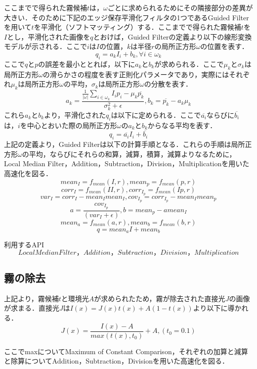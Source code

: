 \documentclass{jsarticle}
\begin{document}
ここまでで得られた霧候補$t$は，$\omega$ごとに求められるためにその隣接部分の差異が大きい．そのために下記のエッジ保存平滑化フィルタの1つであるGuided Filter\cite{2}を用いて$t$を平滑化（ソフトマッティング）する．ここまでで得られた霧候補$t$を$I$とし，平滑化された画像を$q$とおけば，Guided Filterの定義より以下の線形変換モデルが示される．ここで$i$は$I$の位置，$k$は半径$r$の局所正方形$\omega$の位置を表す．
\[
q_i = a_k I_i + b_k, \forall i \in \omega_k
\]
ここで$q$と$p$の誤差を最小ととれば，以下に$a_k$と$b_k$が求められる．ここで$\mu_k$と$\sigma_k$は局所正方形$\omega$の滑らかさの程度を表す正則化パラメータであり，実際にはそれぞれ$\mu_k$は局所正方形$\omega$の平均，$\sigma_k$は局所正方形$\omega$の分散を表す．
\[
a_k = \frac{\frac{1}{|\omega|} \sum_{i \in \omega_k} I_i p_i - \mu_k \overline{p_k}}{\sigma_k^2 + \epsilon},
b_k = \overline{p_k} - a_k \mu_k
\]
これら$a_k$と$b_k$より，平滑化された$q_i$は以下に定められる．ここで$\overline{a_i}$ならびに$\overline{b_i}$は，$i$を中心とおいた際の局所正方形$\omega$の$a_k$と$b_k$からなる平均を表す．
\[
q_i = \overline{a_i} I_i + \overline{b_i}
\]
上記の定義より，Guided Filterは以下の計算手順となる．これらの手順は局所正方形$\omega$の平均，ならびにそれらの和算，減算，積算，減算よりなるために， Local Median Filter，Addition，Subtraction，Division，Multiplicationを用いた高速化を図る．
\[
mean_I = f_{mean}(I,r), mean_p = f_{mean}(p,r)
\]
\[
corr_I = f_{mean}(II,r), corr_{I_{p}} = f_{mean}(Ip,r)
\]
\[
var_I = corr_I - mean_I  mean_I, cov_{I_{p}} = corr_{I_{p}} - mean_I mean_p
\]
\[
a = \frac{cov_{I_{p}}}{(var_I + \epsilon)}, b = mean_p - a  mean_I
\]
\[
mean_a = f_{mean}(a,r), mean_b = f_{mean}(b,r)
\]
\[
q = mean_a  I + mean_b
\]

\begin{itembox}[l]{利用するAPI}
\[
Local Median Filter，Addition，Subtraction，Division，Multiplication
\]
\end{itembox}

\subsection{霧の除去}
\label{霧の除去}

上記より，霧候補$t$と環境光$A$が求められたため，霧が除去された直接光$J$の画像が求まる．直接光$J$は$I(x)=J(x)t(x)+A(1-t(x))$より以下に導かれる．
\[
J(x)=\frac{I(x)-A}{max(t(x), t_0)} + A,(t_0=0.1)
\]

ここでmaxについてMaximum of Constant Comparison，それぞれの加算と減算と除算についてAddition，Subtraction，Divisionを用いた高速化を図る．
\end{document}
